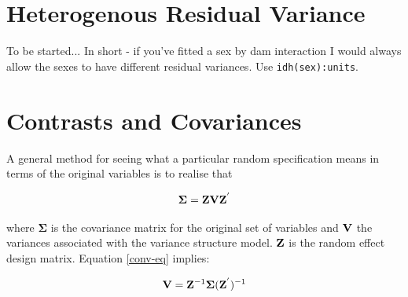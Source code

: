 \documentclass{article}
\begin{document}
\begin{landscape}
\begin{table}
\begin{center}
\begin{tabular}{ccccc}
\right]$\\
\\
\hline
\end{tabular}
\end{center}
\caption{Different random effect specifications in \texttt{lmer}, \texttt{MCMCglmm} and \texttt{asreml}. \texttt{sex} is a factor with three levels so the resulting matrix is $3\times3$. Continuous variables can also go on the LHS of the pipe, or within the variance structure functions (e.g. \texttt{us},\texttt{idh}). In this case the associated parameters are regression coefficients for which a variance is estimated. For example, if the chicks were of different ages (or we'd measured the same chicks at different ages) we may want to see if the growth rate is more similar for chicks raised by the same mother. \texttt{(1+age|dam)} or \texttt{us(1+age):dam} estimates a $2\times2$ matrix which includes the variance in intercepts (when \texttt{age}=0), the variance in slopes, and the covariance that exists between them.}
\label{rspec}
\end{table}
\end{landscape}

\section{Heterogenous Residual Variance}
\label{heter-sec}
To be started... In short - if you've fitted a sex by dam interaction I would always allow the sexes to have different residual variances. Use \texttt{idh(sex):units}.

\section{Contrasts and Covariances}

A general method for seeing what a particular random specification means in terms of the original variables is to realise that 

\begin{equation}
{\bm \Sigma} = {\bf Z}{\bf V}{\bf Z}^{'}
\label{conv-eq}
\end{equation}

where ${\bm \Sigma}$ is the covariance matrix for the original set of variables and ${\bf V}$ the variances associated with the variance structure model. ${\bf Z}$ is the random effect design matrix. Equation \ref{conv-eq} implies:

\begin{equation}
{\bf V} = {\bf Z}^{-1}{\bm \Sigma}({\bf Z}^{'})^{-1}
\end{equation}
\end{document}

